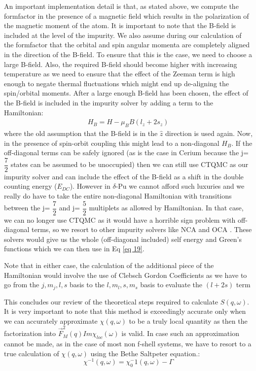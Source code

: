 \documentclass[10pt]{ruthesis}
\begin{document}
{An important implementation detail is that, as stated above, we compute the formfactor in the presence of a magnetic field which results in the polarization of the magnetic moment of the atom. It is important to note that the B-field is included at the level of the impurity. We also assume during our calculation of the formfactor that the orbital and spin angular momenta are completely aligned in the direction of the B-field. To ensure that this is the case, we need to choose a large B-field. Also, the required B-field should become higher with increasing temperature as we need to ensure that the effect of the Zeeman term is high enough to negate thermal fluctuations which might end up de-aligning the spin/orbital moments.
After a large enough B-field has been chosen, the effect of the B-field is included in the impurity solver by adding a term to the Hamiltonian:
\begin{align}
H_{B}=H-\mu_{B}B(l_{z}+2s_{z})
\end{align} 
where the old assumption that the B-field is in the $\hat{z}$ direction is used again. Now, in the presence of spin-orbit coupling this might lead to a non-diagonal $H_{B}$. If the off-diagonal terms can be safely ignored (as is the case in Cerium because the j= $\dfrac{7}{2}$ states can be assumed to be unoccupied) then we can still use CTQMC as our impurity solver and can include the effect of the B-field as a shift in the double counting energy ($E_{DC}$). However in $\delta$-Pu we cannot afford such luxuries and we really do have to take the entire non-diagonal Hamiltonian with transitions between the  j= $\dfrac{7}{2}$ and  j= $\dfrac{5}{2}$ multiplets as allowed by Hamiltonian. In that case, we can no longer use CTQMC as it would have a horrible sign problem with off-diagonal terms, so we resort to other impurity solvers like NCA and OCA \cite{Chuck_prb}. These solvers would give us the whole (off-diagonal included) self energy and Green's functions which we can then use in Eq \ref{eq 19}.

Note that in either case, the calculation of the additional piece of the Hamiltonian would involve the use of Clebsch Gordon Coefficients as we have to go from the $j,m_{j}, l,s$ basis to the $l,m_{l},s,m_{s}$ basis to evaluate the $(l+2s)$ term 

This concludes our review of the theoretical steps required to calculate $S(q,\omega)$. It is very important to note that this method is exceedingly accurate only when we can accurately approximate $\chi(q,\omega)$ to be a truly local quantity as then the factorization into $\vec{F}_M^2(q) Im \chi_{loc}(\omega)$ is valid. In case such an approximation cannot be made, as in the case of most non f-shell systems, we have to resort to a true calculation of $\chi(q,\omega)$ using the Bethe Saltpeter equation.:
\begin{equation}
 \chi^{-1}(q,\omega)= \chi_0^-{1}(q,\omega) - \Gamma
 \end{equation}
 
}
\end{document}
